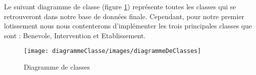 Le suivant diagramme de classe (figure \ref{diagramme_classe}) représente toutes les classes qui se retrouveront dans notre base de données finale. Cependant, pour notre premier lotissement nous nous contenterons d'implémenter les trois principales classes que sont : Benevole, Intervention et Etablissement.
\begin{figure}[H]
	\centering
	\texttt{[image: diagrammeClasse/images/diagrammeDeClasses]}
	\caption{Diagramme de classes}
	\label{diagramme_classe}	
\end{figure}	